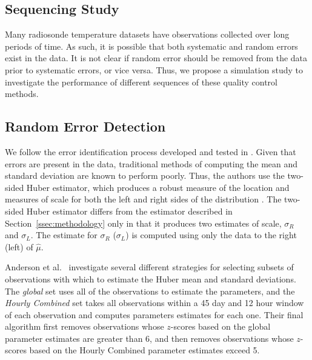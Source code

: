 \documentclass[12pt]{article}
\begin{document}
\begin{doublespacing}
\section{Sequencing Study}

Many radiosonde temperature datasets have observations collected over long periods of time.  As such, it is possible that both systematic and random errors exist in the data.  It is not clear if random error should be removed from the data prior to systematic errors, or vice versa.  Thus, we propose a simulation study to investigate the performance of different sequences of these quality control methods.

\subsection{Random Error Detection}
We follow the error identification process developed and tested in \cite{bell14}.  Given that errors are present in the data, traditional methods of computing the mean and standard deviation are known to perform poorly.  Thus, the authors use the two-sided Huber estimator, which produces a robust measure of the location and measures of scale for both the left and right sides of the distribution \cite{huber11}.  The two-sided Huber estimator differs from the estimator described in Section~\ref{ssec:methodology} only in that it produces two estimates of scale, $\sigma_R$ and $\sigma_L$.  The estimate for $\sigma_R$ ($\sigma_L$) is computed using only the data to the right (left) of $\hat{\mu}$.

Anderson et al.~\cite{bell14} investigate several different strategies for selecting subsets of observations with which to estimate the Huber mean and standard deviations.  The \emph{global} set uses all of the observations to estimate the parameters, and the \emph{Hourly Combined} set takes all observations within  a 45 day and 12 hour window of each observation and computes parameters estimates for each one.  Their final algorithm first removes observations whose $z$-scores based on the global parameter estimates are greater than 6, and then removes observations whose $z$-scores  based on the Hourly Combined parameter estimates exceed 5.  



\end{doublespacing}
\end{document}

